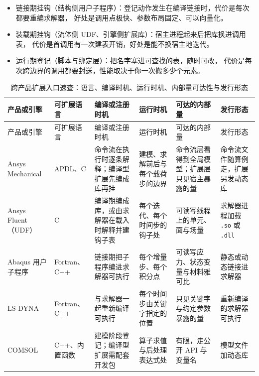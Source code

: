 \documentclass[12pt,a4paper,fontset=fandol]{ctexbook}
\newcommand{\Tp}[1]{\texttt{#1}}
\newcommand{\Lang}[1]{\textsf{#1}}
\newcommand{\CL}{\Lang{C}}
\newcommand{\CPP}{\Lang{C++}}
\begin{document}
\begin{compare}[title={三族入口的差别其实只有一处}]
\begin{itemize}
\item 链接期挂钩（结构侧用户子程序）：登记动作发生在编译链接时，代价是每次都要重编求解器，
  好处是调用点极快、参数布局固定、可以向量化。
\item 装载期挂钩（流体侧 UDF、引擎侧扩展库）：宿主进程起来后把库换进调用表，
  代价是首调用有一次建表开销，好处是能不换宿主地迭代。
\item 运行期登记（脚本与绑定层）：把名字塞进可查找的表，随时可改，
  代价是每次跨边界的调用都要封送，性能取决于你一次搬多少个元素。
\end{itemize}
\end{compare}

\scriptsize
\begin{longtable}{>{\raggedright\arraybackslash}p{}>{\raggedright\arraybackslash}p{}>{\raggedright\arraybackslash}p{}>{\raggedright\arraybackslash}p{}>{\raggedright\arraybackslash}p{}>{\raggedright\arraybackslash}p{}}
\caption{跨产品扩展入口速查：语言、编译时机、运行时机、内部量可达性与发行形态}\label{tab:apB-hooks}\\
\toprule
产品或引擎 & 可扩展语言 & 编译或注册时机 & 运行时机 & 可达的内部量 & 发行形态 \\
\midrule
\endfirsthead
\toprule
产品或引擎 & 可扩展语言 & 编译或注册时机 & 运行时机 & 可达的内部量 & 发行形态 \\
\midrule
\endhead
\endfoot
\bottomrule
\endlastfoot
Ansys Mechanical & APDL、\CL & 命令流在执行时逐条解释；编译型扩展先编成库再挂 & 建模、求解前后与每个载荷步的边界 & 命令流层看得到全局模型；扩展层只见宿主暴露的量 & 命令流文件随算例走，扩展另发动态库 \\
Ansys Fluent（UDF） & \CL & 编译期编成库，或由求解器在载入时解释并建钩子表 & 每个迭代、每个时间步的钩子处 & 可读写线程上的单元、面与场量 & 求解器进程加载 \Tp{.so} 或 \Tp{.dll} \\
Abaqus 用户子程序 & Fortran、\CPP & 链接期把子程序编进求解器可执行 & 每个增量步、每个积分点 & 可读写应力、状态变量与材料雅可比 & 静态或动态链接进求解器 \\
LS-DYNA & Fortran、\CPP & 与求解器一起重新编译可执行 & 每个时间步由关键字指定的位置 & 只见关键字与约定参数暴露的量 & 重新编译的求解器可执行 \\
COMSOL & \CPP、内置函数 & 建模阶段登记；编译型扩展需配套开发包 & 算子求值与后处理表达式处 & 有限，走公开 API 与变量名 & 模型文件加动态库 \\

\end{longtable}
\end{document}
